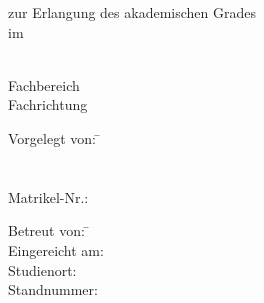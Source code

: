 \begin{titlepage}

\begin{minipage}{\textwidth}
		\noindent \hfill 
\end{minipage}
\vspace{4em}

\begin{center}
    {\huge \art}

    {\Large zur Erlangung des akademischen Grades \akadGrad}\\
    {\Large im \studiengang}

    \vspace{4em}

    \textbf{{\Large \titel}}

    \vspace{4em}

    \hochschule \\
    Fachbereich \fachbereich \\
    Fachrichtung \fachrichtung

    \vspace{10em}

	\begin{multicols}{2}
	\begin{minipage}{\textwidth}
		\begin{tabbing}

		Vorgelegt von:  \hspace*{0.5em}\= \autor \\
		\> \strasseAutor \\
        \> \stadtAutor \\
        Matrikel-Nr.: \> \matrikelnr
        \end{tabbing}
    \end{minipage}
        
	\begin{minipage}{\textwidth}
		\begin{tabbing}
		 
        Betreut von: \hspace*{1.5em}\= \betreuer \\
        Eingereicht am: \> \datumAbgabe \\
        Studienort: \> \ort \\
        Standnummer: \> \standnummer
		\end{tabbing}

	\end{minipage}
	\end{multicols}
\end{center}
\end{titlepage}
